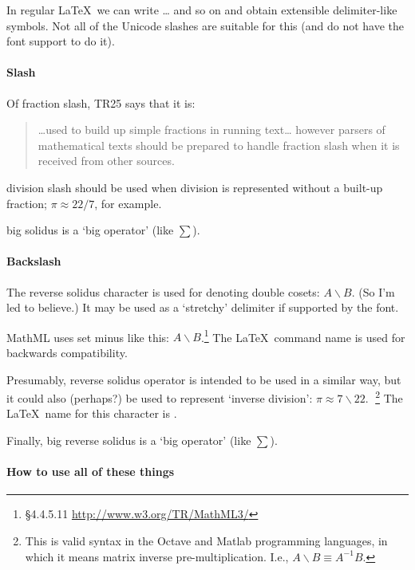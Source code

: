 In regular \LaTeX\ we can write \dots{}
and so on and obtain extensible delimiter-like symbols. Not all of the Unicode slashes
are suitable for this (and do not have the font support to do it).

\paragraph{Slash}

Of  {fraction slash}, TR25 says that it is:
\begin{quote}
\dots used to build up simple fractions in running text\dots
however parsers of mathematical texts should be prepared to handle fraction slash
when it is received from other sources.
\end{quote}

 {division slash} should be used when division is represented
without a built-up fraction; $\pi\approx22/7$, for example.

 {big solidus} is a `big operator' (like $\sum$).

\paragraph{Backslash}

The  {reverse solidus} character  is used for denoting
double cosets: $A\backslash B$. (So I'm led to believe.)
It may be used as a `stretchy' delimiter if supported by the font.

MathML uses  {set minus} like this: $A\smallsetminus B$.\footnote{\S4.4.5.11 \url{http://www.w3.org/TR/MathML3/}}
The \LaTeX\ command name  is used for backwards compatibility.

Presumably,  {reverse solidus operator} is intended to
be used in a similar way, but it could also (perhaps?) be used to
represent `inverse division': $\pi\approx7\mathbin{\backslash}22$.^^A
\footnote{This is valid syntax in the Octave and Matlab programming languages,
in which it means matrix inverse pre-multiplication. I.e., $A\mathbin{\backslash} B\equiv A^{-1}B$.}
The \LaTeX\ name for this character is .

Finally,  {big reverse solidus} is a `big operator' (like $\sum$).

\paragraph{How to use all of these things}

